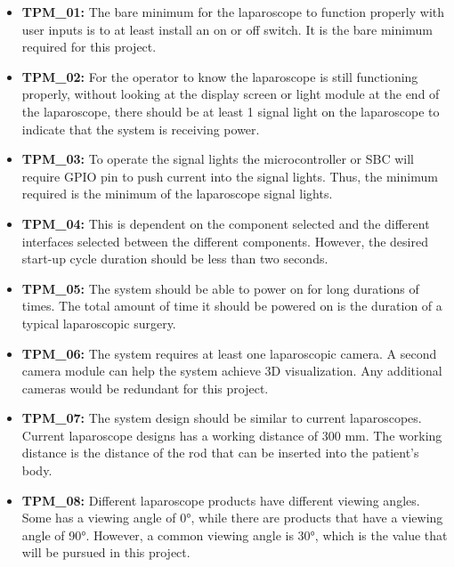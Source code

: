 \begin{itemize}
     

    \item\textbf{TPM\_01:} The bare minimum for the laparoscope to function properly with user inputs is to at least install an on or off switch. It is the bare minimum required for this project.

    \item\textbf{TPM\_02:} For the operator to know the laparoscope is still functioning properly, without looking at the display screen or light module at the end of the laparoscope, there should be at least 1 signal light on the laparoscope to indicate that the system is receiving power.

    \item\textbf{TPM\_03:} To operate the signal lights the microcontroller or SBC will require GPIO pin to push current into the signal lights. Thus, the minimum required is the minimum of the laparoscope signal lights.

    \item\textbf{TPM\_04:} This is dependent on the component selected and the different interfaces selected between the different components. However, the desired start-up cycle duration should be less than two seconds.

    \item\textbf{TPM\_05:} The system should be able to power on for long durations of times. The total amount of time it should be powered on is the duration of a typical laparoscopic surgery. 

    \item\textbf{TPM\_06:} The system requires at least one laparoscopic camera. A second camera module can help the system achieve 3D visualization. Any additional cameras would be redundant for this project.

    \item\textbf{TPM\_07:} The system design should be similar to current laparoscopes. Current laparoscope designs has a working distance of 300 mm. The working distance is the distance of the rod that can be inserted into the patient's body.

    \item\textbf{TPM\_08:} Different laparoscope products have different viewing angles. Some has a viewing angle of 0°, while there are products that have a viewing angle of 90°. However, a common viewing angle is 30°, which is the value that will be pursued in this project.


\end{itemize}
